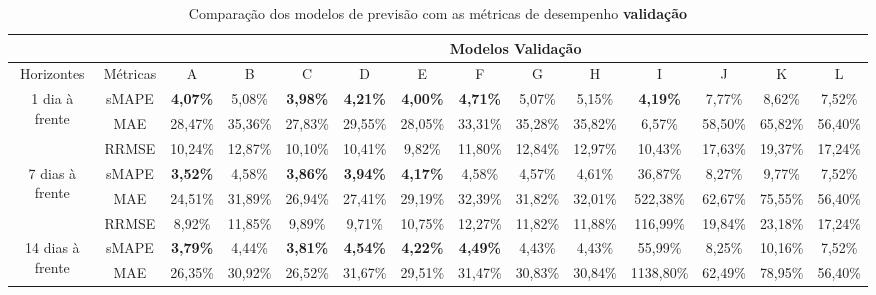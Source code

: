 \begin{landscape}
\begin{table}[!htpb]
	\centering
	\caption{Comparação dos modelos de previsão com as métricas de desempenho \textbf{validação}}\label{tb:apd-vld}
\begin{tabular}{@{}cccccccccccccc@{}}
	\toprule
	&          & \multicolumn{12}{c}{Modelos Validação}                                                                                                                                \\ \midrule
	Horizontes                        & Métricas & A               & B       & C               & D               & E               & F               & G       & H       & I               & J       & K       & L       \\ \midrule
	\multirow{3}{*}{1 dia à frente}   & sMAPE    & \textbf{4,07\%} & 5,08\%  & \textbf{3,98\%} & \textbf{4,21\%} & \textbf{4,00\%} & \textbf{4,71\%} & 5,07\%  & 5,15\%  & \textbf{4,19\%} & 7,77\%  & 8,62\%  & 7,52\%  \\
	& MAE      & 28,47\%         & 35,36\% & 27,83\%         & 29,55\%         & 28,05\%         & 33,31\%         & 35,28\% & 35,82\% & 6,57\%          & 58,50\% & 65,82\% & 56,40\% \\
	& RRMSE    & 10,24\%         & 12,87\% & 10,10\%         & 10,41\%         & 9,82\%          & 11,80\%         & 12,84\% & 12,97\% & 10,43\%         & 17,63\% & 19,37\% & 17,24\% \\ \midrule
	\multirow{3}{*}{7 dias à frente}  & sMAPE    & \textbf{3,52\%} & 4,58\%  & \textbf{3,86\%} & \textbf{3,94\%} & \textbf{4,17\%} & 4,58\%          & 4,57\%  & 4,61\%  & 36,87\%         & 8,27\%  & 9,77\%  & 7,52\%  \\
	& MAE      & 24,51\%         & 31,89\% & 26,94\%         & 27,41\%         & 29,19\%         & 32,39\%         & 31,82\% & 32,01\% & 522,38\%        & 62,67\% & 75,55\% & 56,40\% \\
	& RRMSE    & 8,92\%          & 11,85\% & 9,89\%          & 9,71\%          & 10,75\%         & 12,27\%         & 11,82\% & 11,88\% & 116,99\%        & 19,84\% & 23,18\% & 17,24\% \\ \midrule
	\multirow{3}{*}{14 dias à frente} & sMAPE    & \textbf{3,79\%} & 4,44\%  & \textbf{3,81\%} & \textbf{4,54\%} & \textbf{4,22\%} & \textbf{4,49\%} & 4,43\%  & 4,43\%  & 55,99\%         & 8,25\%  & 10,16\% & 7,52\%  \\
	& MAE      & 26,35\%         & 30,92\% & 26,52\%         & 31,67\%         & 29,51\%         & 31,47\%         & 30,83\% & 30,84\% & 1138,80\%       & 62,49\% & 78,95\% & 56,40\% \\

\end{tabular}
\end{table}
\end{landscape}
